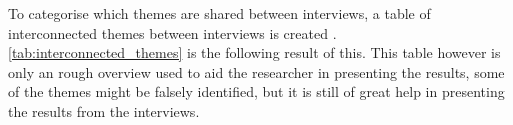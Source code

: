 To categorise which themes are shared between interviews, a table of interconnected themes between interviews is created \cite{bjo_2022}. \autoref{tab:interconnected_themes} is the following result of this. This table however is only an rough overview used to aid the researcher in presenting the results, some of the themes might be falsely identified, but it is still of great help in presenting the results from the interviews.

\begin{table}[H]
\end{table}
